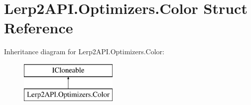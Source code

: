 \hypertarget{struct_lerp2_a_p_i_1_1_optimizers_1_1_color}{}\section{Lerp2\+A\+P\+I.\+Optimizers.\+Color Struct Reference}
\label{struct_lerp2_a_p_i_1_1_optimizers_1_1_color}
Inheritance diagram for Lerp2\+A\+P\+I.\+Optimizers.\+Color\+:\begin{figure}[H]
\begin{center}
\leavevmode
\includegraphics[height=2.000000cm]{struct_lerp2_a_p_i_1_1_optimizers_1_1_color}
\end{center}
\end{figure}
